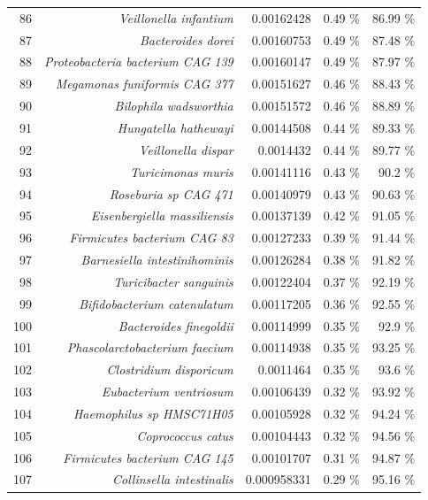 \documentclass{article}
\begin{document}
\begin{table}
\begin{tabular}{|r|r|r|r|r|}
      86 & \textit{Veillonella infantium} & 0.00162428 & 0.49 \% & 86.99 \% \\
      87 & \textit{Bacteroides dorei} & 0.00160753 & 0.49 \% & 87.48 \% \\
      88 & \textit{Proteobacteria bacterium CAG 139} & 0.00160147 & 0.49 \% & 87.97 \% \\
      89 & \textit{Megamonas funiformis CAG 377} & 0.00151627 & 0.46 \% & 88.43 \% \\
      90 & \textit{Bilophila wadsworthia} & 0.00151572 & 0.46 \% & 88.89 \% \\
      91 & \textit{Hungatella hathewayi} & 0.00144508 & 0.44 \% & 89.33 \% \\
      92 & \textit{Veillonella dispar} & 0.0014432 & 0.44 \% & 89.77 \% \\
      93 & \textit{Turicimonas muris} & 0.00141116 & 0.43 \% & 90.2 \% \\
      94 & \textit{Roseburia sp CAG 471} & 0.00140979 & 0.43 \% & 90.63 \% \\
      95 & \textit{Eisenbergiella massiliensis} & 0.00137139 & 0.42 \% & 91.05 \% \\
      96 & \textit{Firmicutes bacterium CAG 83} & 0.00127233 & 0.39 \% & 91.44 \% \\
      97 & \textit{Barnesiella intestinihominis} & 0.00126284 & 0.38 \% & 91.82 \% \\
      98 & \textit{Turicibacter sanguinis} & 0.00122404 & 0.37 \% & 92.19 \% \\
      99 & \textit{Bifidobacterium catenulatum} & 0.00117205 & 0.36 \% & 92.55 \% \\
      100 & \textit{Bacteroides finegoldii} & 0.00114999 & 0.35 \% & 92.9 \% \\
      101 & \textit{Phascolarctobacterium faecium} & 0.00114938 & 0.35 \% & 93.25 \% \\
      102 & \textit{Clostridium disporicum} & 0.0011464 & 0.35 \% & 93.6 \% \\
      103 & \textit{Eubacterium ventriosum} & 0.00106439 & 0.32 \% & 93.92 \% \\
      104 & \textit{Haemophilus sp HMSC71H05} & 0.00105928 & 0.32 \% & 94.24 \% \\
      105 & \textit{Coprococcus catus} & 0.00104443 & 0.32 \% & 94.56 \% \\
      106 & \textit{Firmicutes bacterium CAG 145} & 0.00101707 & 0.31 \% & 94.87 \% \\
      107 & \textit{Collinsella intestinalis} & 0.000958331 & 0.29 \% & 95.16 \% \\

\end{tabular}
\end{table}
\end{document}

